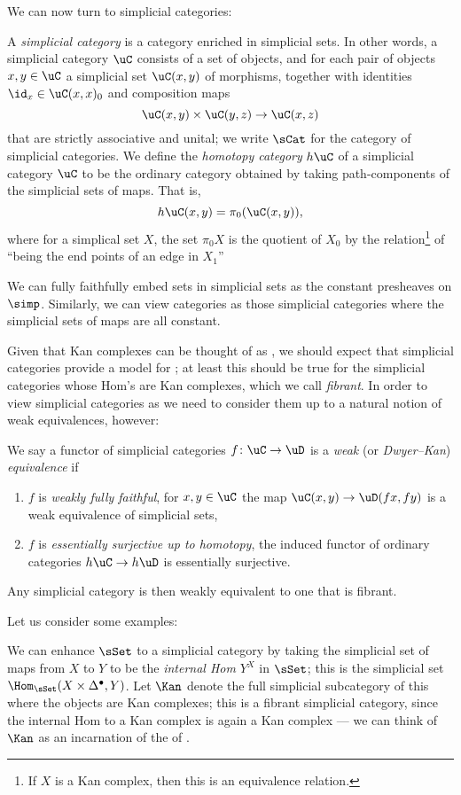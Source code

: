 \documentclass[a4paper,12pt]{article}
\begin{document}
We can now turn to simplicial categories:
\begin{defn}
  A \emph{simplicial category} is a category enriched in simplicial
  sets. In other words, a simplicial category $\uC$ consists of a set
  of objects, and for each pair of objects $x,y \in \uC$ a simplicial
  set $\uC(x,y)$ of morphisms, together with identities $\id_{x} \in
  \uC(x,x)_{0}$ and composition maps
  \[ \uC(x,y) \times \uC(y,z)\to \uC(x,z)\] that are strictly
  associative and unital; we write $\sCat$ for the category of
  simplicial categories. We define the \emph{homotopy category}
  $h\uC$ of a simplicial category $\uC$ to be the ordinary category
  obtained by taking path-components of the simplicial sets of
  maps. That is,
  \[ h\uC(x,y) = \pi_{0}(\uC(x,y)),\] where for a simplical set $X$,
  the set $\pi_{0}X$ is the quotient of $X_{0}$ by the
  relation\footnote{If $X$ is a Kan complex, then this is an
    equivalence relation.} of ``being the end points of an edge in
  $X_{1}$''
\end{defn}

\begin{remark}
  We can fully faithfully embed sets in simplicial sets as the constant
  presheaves on $\simp$. Similarly, we can view categories as those
  simplicial categories where the simplicial sets of maps are all
  constant.
\end{remark}

Given that Kan complexes can be thought of as \igpds{}, we should
expect that simplicial categories provide a model for \icats{}; at
least this should be true for the simplicial categories whose Hom's
are Kan complexes, which we call \emph{fibrant}. In order to view
simplicial categories as \icats{} we need to
consider them up to a natural notion of weak
equivalences, however:
\begin{defn}\label{defn:DKeq}
  We say a functor of simplicial categories $f \colon \uC \to \uD$ is
  a \emph{weak} (or \emph{Dwyer--Kan}) \emph{equivalence} if
  \begin{enumerate}[(1)]
  \item $f$ is \emph{weakly fully faithful}, \ie{} for $x,y \in \uC$
    the map $\uC(x,y) \to \uD(fx,fy)$ is a
    weak equivalence of simplicial sets,
  \item $f$ is \emph{essentially surjective up to homotopy}, \ie{} the
    induced functor of ordinary categories $h\uC \to h\uD$ is
    essentially surjective.
  \end{enumerate}
Any simplicial category is then weakly equivalent to one that is
fibrant.
\end{defn}
Let us consider some examples:
\begin{ex}
  We can enhance $\sSet$ to a simplicial category by taking the
  simplicial set of maps from $X$ to $Y$ to be the \emph{internal Hom}
  $Y^{X}$ in $\sSet$; this is the simplicial set $\Hom_{\sSet}(X
  \times \Delta^{\bullet}, Y)$. Let $\Kan$ denote the full
  simplicial subcategory of this where the objects are Kan complexes;
  this is a fibrant simplicial category, since the internal Hom to a
  Kan complex is again a Kan complex --- we can think of
  $\Kan$ as an incarnation of the \icat{} of \igpds{}.
\end{ex}
\end{document}
